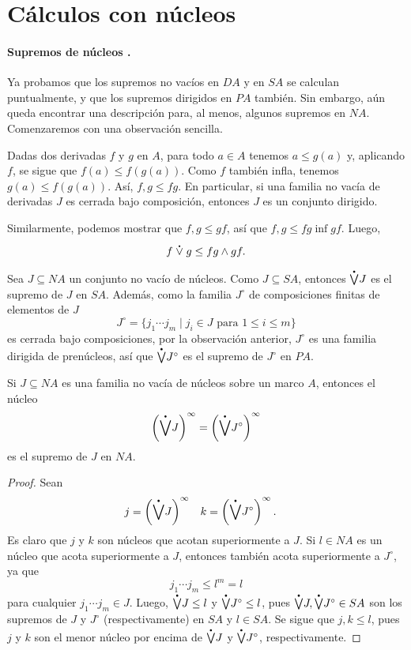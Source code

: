 \chapter{Cálculos con núcleos}
\label{ssec:calculos}

\subsubsection{Supremos de núcleos .}

Ya probamos que los supremos no vacíos en $DA$ y en $SA$ se
calculan puntualmente, y que los supremos dirigidos en $PA$
también.
Sin embargo, aún queda encontrar una descripción para, al menos,
algunos supremos en $NA$.
Comenzaremos con una observación sencilla.
\begin{remark}
  Dadas dos derivadas $f$ y $g$ en $A$,
  para todo $a\in A$ tenemos $a\leq g(a)$ y,
  aplicando $f$, se sigue que $f(a)\leq f(g(a))$.
  Como $f$ también infla, tenemos $g(a)\leq f(g(a))$.
  Así, $f,g\leq fg$. En particular, si una familia no vacía de
  derivadas $J$ es cerrada bajo composición, entonces $J$ es un
  conjunto dirigido.

  Similarmente, podemos mostrar que $f,g\leq gf$, así que  $f,g\leq
  fg\inf gf$. Luego,
  \[
    f\psup g \leq fg\inf gf
  .\]
\end{remark}

Sea $J\subseteq NA$ un conjunto no vacío de núcleos.
Como $J\subseteq SA$, entonces $\pSup J$ es el supremo de $J$ en $SA$.
Además, como la familia $J^\circ$
de composiciones finitas de elementos de $J$
\[
  J^\circ = \{j_1\cdots j_m \mid j_i\in J \text{ para } 1\leq
  i\leq m\}
\]
es cerrada bajo composiciones, por la observación anterior, $J^\circ$
es una familia dirigida de prenúcleos, así que $\pSup J^\circ$
es el supremo de $J^\circ$ en $PA$.

\begin{lemma}
  Si $J\subseteq NA$ es una familia no vacía de núcleos sobre un
  marco $A$, entonces el núcleo
  \[
    \left(\pSup J\right)^\infty = \left(\pSup J^\circ\right)^\infty
  \]
  es el supremo de $J$ en $NA$.
\end{lemma}
\begin{proof}
  Sean
  \begin{align*}
    j &= \left(\pSup J\right)^\infty &
    k &= \left(\pSup J^\circ\right)^\infty.
  \end{align*}
  Es claro que $j$ y $k$ son núcleos que acotan superiormente a
  $J$.
  Si $l\in NA$ es un núcleo que acota superiormente a $J$, entonces
  también acota superiormente a $J^\circ$, ya que
  \[
    j_1\cdots j_m \leq l^m = l
  \]
  para cualquier $j_1\cdots j_m\in J$.
  Luego, $\pSup J\leq l$ y $\pSup J^\circ \leq l$,
  pues $\pSup J,\pSup J^\circ\in SA$ son los supremos de $J$ y $J^\circ$
  (respectivamente) en $SA$ y $l\in SA$.
  Se sigue que $j,k\leq l$, pues $j$ y $k$ son el menor núcleo por
  encima de $\pSup J$ y $\pSup J^\circ$, respectivamente.
\end{proof}


